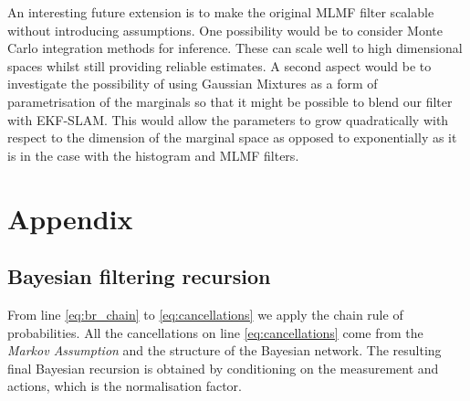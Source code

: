 An interesting future extension is to make the original MLMF filter scalable without introducing assumptions.
One possibility would be to consider Monte Carlo integration methods for inference. These can scale well to high dimensional 
spaces whilst still providing reliable estimates. A second aspect would be to investigate the possibility
of using Gaussian Mixtures as a form of parametrisation of the marginals so that it might be possible to blend our filter with  
EKF-SLAM. This would allow the parameters to grow quadratically with respect to the dimension of the marginal space as opposed to
exponentially as it is in the case with the histogram and MLMF filters.



\section{Appendix}\label{ch5:appendix}

\subsection{Bayesian filtering recursion}\label{appendix:bayes_recursion}

From line \ref{eq:br_chain} to \ref{eq:cancellations} we apply the chain rule of probabilities.
All the cancellations on line \ref{eq:cancellations} come from the \textit{Markov Assumption} and the structure of the Bayesian network.
The resulting final Bayesian recursion is obtained by conditioning on the measurement and actions, which is the normalisation factor.

